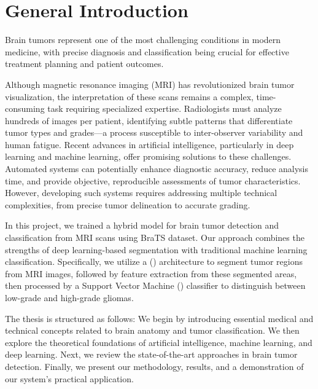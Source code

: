 \chapter*{General Introduction}

Brain tumors represent one of the most challenging conditions in modern medicine, with precise diagnosis and classification being crucial for effective treatment planning and patient outcomes.

Although magnetic resonance imaging (MRI) has revolutionized brain tumor visualization, the interpretation of these scans remains a complex, time-consuming task requiring specialized expertise. Radiologists must analyze hundreds of images per patient, identifying subtle patterns that differentiate tumor types and grades—a process susceptible to inter-observer variability and human fatigue. Recent advances in artificial intelligence, particularly in deep learning and machine learning, offer promising solutions to these challenges. Automated systems can potentially enhance diagnostic accuracy, reduce analysis time, and provide objective, reproducible assessments of tumor characteristics. However, developing such systems requires addressing multiple technical complexities, from precise tumor delineation to accurate grading.

In this project, we trained a hybrid model for brain tumor detection and classification from MRI scans using BraTS dataset. Our approach combines the strengths of deep learning-based segmentation with traditional machine learning classification. Specifically, we utilize a () architecture to segment tumor regions from MRI images, followed by feature extraction from these segmented areas, then processed by a Support Vector Machine () classifier to distinguish between low-grade and high-grade gliomas.

The thesis is structured as follows: We begin by introducing essential medical and technical concepts related to brain anatomy and tumor classification. We then explore the theoretical foundations of artificial intelligence, machine learning, and deep learning. Next, we review the state-of-the-art approaches in brain tumor detection. Finally, we present our methodology, results, and a demonstration of our system's practical application.
